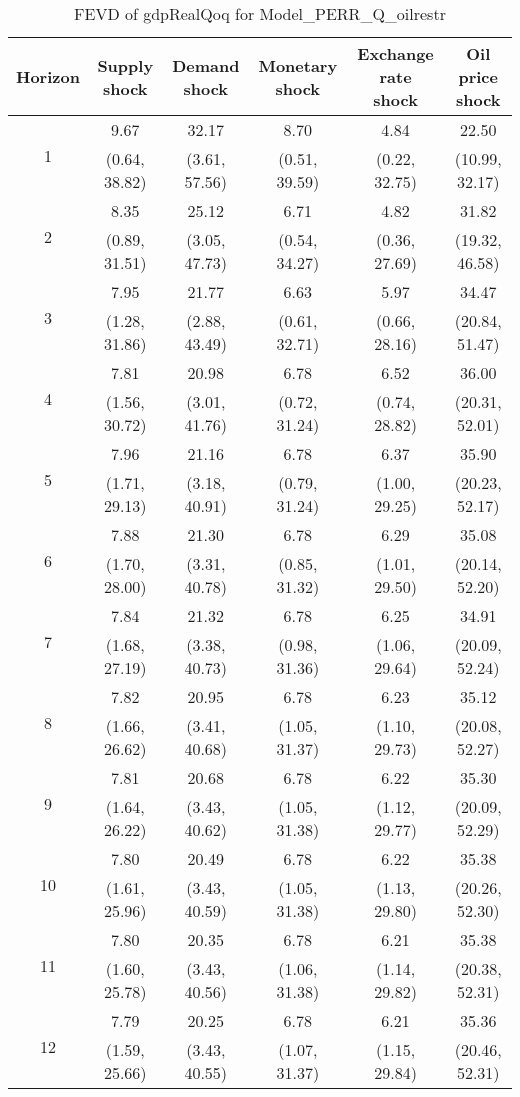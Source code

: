 \documentclass{article}
\begin{document}
\begin{table}
	\footnotesize
	\caption{FEVD of gdpRealQoq for Model_PERR_Q_oilrestr}
	\begin{tabular}{cccccc}
		Horizon & Supply shock & Demand shock & Monetary shock & Exchange rate shock & Oil price shock\\ \hline
		\multirow{2}{*}{1} & 9.67 & 32.17 & 8.70 & 4.84 & 22.50\\
		 & (0.64, 38.82) & (3.61, 57.56) & (0.51, 39.59) & (0.22, 32.75) & (10.99, 32.17)\\
		\multirow{2}{*}{2} & 8.35 & 25.12 & 6.71 & 4.82 & 31.82\\
		 & (0.89, 31.51) & (3.05, 47.73) & (0.54, 34.27) & (0.36, 27.69) & (19.32, 46.58)\\
		\multirow{2}{*}{3} & 7.95 & 21.77 & 6.63 & 5.97 & 34.47\\
		 & (1.28, 31.86) & (2.88, 43.49) & (0.61, 32.71) & (0.66, 28.16) & (20.84, 51.47)\\
		\multirow{2}{*}{4} & 7.81 & 20.98 & 6.78 & 6.52 & 36.00\\
		 & (1.56, 30.72) & (3.01, 41.76) & (0.72, 31.24) & (0.74, 28.82) & (20.31, 52.01)\\
		\multirow{2}{*}{5} & 7.96 & 21.16 & 6.78 & 6.37 & 35.90\\
		 & (1.71, 29.13) & (3.18, 40.91) & (0.79, 31.24) & (1.00, 29.25) & (20.23, 52.17)\\
		\multirow{2}{*}{6} & 7.88 & 21.30 & 6.78 & 6.29 & 35.08\\
		 & (1.70, 28.00) & (3.31, 40.78) & (0.85, 31.32) & (1.01, 29.50) & (20.14, 52.20)\\
		\multirow{2}{*}{7} & 7.84 & 21.32 & 6.78 & 6.25 & 34.91\\
		 & (1.68, 27.19) & (3.38, 40.73) & (0.98, 31.36) & (1.06, 29.64) & (20.09, 52.24)\\
		\multirow{2}{*}{8} & 7.82 & 20.95 & 6.78 & 6.23 & 35.12\\
		 & (1.66, 26.62) & (3.41, 40.68) & (1.05, 31.37) & (1.10, 29.73) & (20.08, 52.27)\\
		\multirow{2}{*}{9} & 7.81 & 20.68 & 6.78 & 6.22 & 35.30\\
		 & (1.64, 26.22) & (3.43, 40.62) & (1.05, 31.38) & (1.12, 29.77) & (20.09, 52.29)\\
		\multirow{2}{*}{10} & 7.80 & 20.49 & 6.78 & 6.22 & 35.38\\
		 & (1.61, 25.96) & (3.43, 40.59) & (1.05, 31.38) & (1.13, 29.80) & (20.26, 52.30)\\
		\multirow{2}{*}{11} & 7.80 & 20.35 & 6.78 & 6.21 & 35.38\\
		 & (1.60, 25.78) & (3.43, 40.56) & (1.06, 31.38) & (1.14, 29.82) & (20.38, 52.31)\\
		\multirow{2}{*}{12} & 7.79 & 20.25 & 6.78 & 6.21 & 35.36\\
		 & (1.59, 25.66) & (3.43, 40.55) & (1.07, 31.37) & (1.15, 29.84) & (20.46, 52.31)\\
	\end{tabular}
\label{tab:fevd-Model_PERR_Q_oilrestr-gdpRealQoq}
\end{table}
\end{document}
